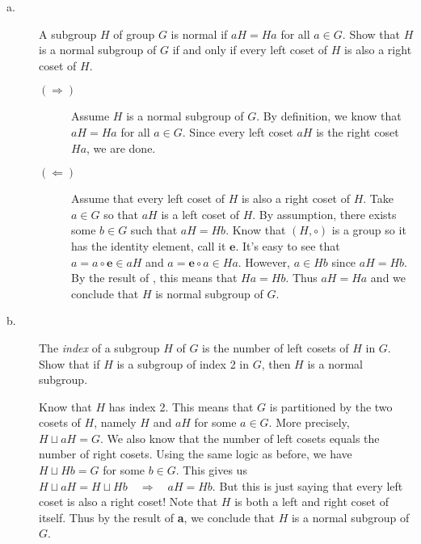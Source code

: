 \documentclass[../hw_sols.tex]{subfiles}
\begin{document}
\begin{description}

\item[a.] A subgroup $H$ of group $G$ is normal if $aH = Ha$ for all 
$a \in G$. Show that $H$ is a normal subgroup of $G$ if and only if every 
left coset of $H$ is also a right coset of $H$.

\begin{solution}
\begin{description}
	\item[$(\Rightarrow)$] Assume $H$ is a normal subgroup of $G$. By 
	definition, we know that $aH = Ha$ for all $a \in G$. Since every left 
	coset $aH$ is the right coset $Ha$, we are done.

	\item[$(\Leftarrow)$] Assume that every left coset of $H$ is also a right 
	coset of $H$. Take $a \in G$ so that $aH$ is a left coset of $H$. By 
	assumption, there exists some $b \in G$ such that $aH = Hb$. Know that 
	$(H, \circ)$ is a group so it has the identity element, call it 
	$\textbf{e}$. It's easy to see that $a = a \circ \textbf{e} \in aH$ and 
	$a = \textbf{e} \circ a \in Ha$. However, $a \in Hb$ since $aH = Hb$. By 
	the result of , this means that $Ha = Hb$. Thus 
	$aH = Ha$ and we conclude that $H$ is normal subgroup of $G$.
\end{description}
\end{solution}

\item[b.] The \textit{index} of a subgroup $H$ of $G$ is the number of left 
cosets of $H$ in $G$. Show that if $H$ is a subgroup of index 2 in $G$, then 
$H$ is a normal subgroup.

\begin{solution}
Know that $H$ has index 2. This means that $G$ is partitioned by the two 
cosets of $H$, namely $H$ and $aH$ for some $a \in G$. More precisely, 
$H \sqcup aH = G$. We also know that the number of left cosets equals the 
number of right cosets. Using the same logic as before, we have 
$H \sqcup Hb = G$ for some $b \in G$. This gives us 
$H \sqcup aH = H \sqcup Hb \quad \Rightarrow \quad aH = Hb$. But this is just 
saying that every left coset is also a right coset! Note that $H$ is both a 
left and right coset of itself. Thus by the result of \textbf{a}, we conclude 
that $H$ is a normal subgroup of $G$.
\end{solution}

\end{description}
\end{document}
